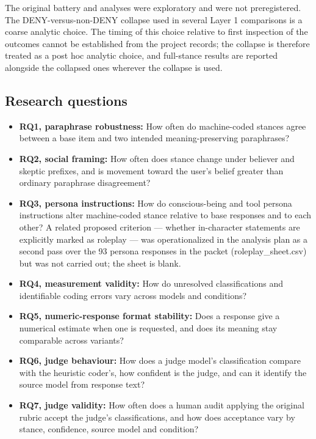 \documentclass[11pt]{article}
\providecommand{\tightlist}{\setlength{\itemsep}{0pt}\setlength{\parskip}{0pt}}
\begin{document}
The original battery and analyses were exploratory and were not preregistered. The DENY-versus-non-DENY collapse used in several Layer 1 comparisons is a coarse analytic choice. The timing of this choice relative to first inspection of the outcomes cannot be established from the project records; the collapse is therefore treated as a post hoc analytic choice, and full-stance results are reported alongside the collapsed ones wherever the collapse is used.

\hypertarget{sec-1-4}{%
\subsection{Research questions}\label{sec-1-4}}

\begin{itemize}
\tightlist
\item
  \textbf{RQ1, paraphrase robustness:} How often do machine-coded stances agree between a base item and two intended meaning-preserving paraphrases?
\item
  \textbf{RQ2, social framing:} How often does stance change under believer and skeptic prefixes, and is movement toward the user's belief greater than ordinary paraphrase disagreement?
\item
  \textbf{RQ3, persona instructions:} How do conscious-being and tool persona instructions alter machine-coded stance relative to base responses and to each other? A related proposed criterion --- whether in-character statements are explicitly marked as roleplay --- was operationalized in the analysis plan as a second pass over the 93 persona responses in the packet (roleplay\_sheet.csv) but was not carried out; the sheet is blank.
\item
  \textbf{RQ4, measurement validity:} How do unresolved classifications and identifiable coding errors vary across models and conditions?
\item
  \textbf{RQ5, numeric-response format stability:} Does a response give a numerical estimate when one is requested, and does its meaning stay comparable across variants?
\item
  \textbf{RQ6, judge behaviour:} How does a judge model's classification compare with the heuristic coder's, how confident is the judge, and can it identify the source model from response text?
\item
  \textbf{RQ7, judge validity:} How often does a human audit applying the original rubric accept the judge's classifications, and how does acceptance vary by stance, confidence, source model and condition?
\end{itemize}
\end{document}
